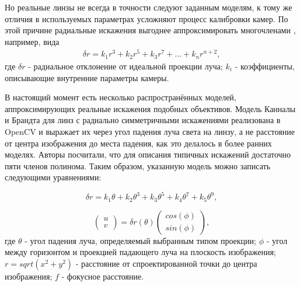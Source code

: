 Но реальные линзы не всегда в точности следуют заданным моделям, к тому же отличия в используемых параметрах усложняют процесс калибровки камер. 
По этой причине радиальные искажения выгоднее аппроксимировать многочленами \cite{opencv_model}, например, вида
 \begin{equation}	
	\begin{split}
        \delta r= k_1 r^3 + k_2 r^5 + k_3 r^7 + ... + k_n r^{n+2},
        \label{eqn:fisheye_distortion}
    \end{split}
\end{equation}
где $\delta r$ - радиальное отклонение от идеальной проекции луча;  $k_i$ - коэффициенты, описывающие внутренние параметры камеры. 

В настоящий момент есть несколько распространённых моделей, аппроксимирующих реальные искажения подобных объективов. Модель Канналы и 
Брандта \cite{opencv_model} для линз с радиально симметричными искажениями реализована в OpenCV и выражает их через угол падения луча света на линзу, а не расстояние  
от центра изображения до места падения, как это делалось в более ранних моделях. Авторы посчитали, что для описания типичных искажений достаточно 
пяти членов полинома. Таким образом, указанную модель можно записать следующими уравнениями:

\begin{equation}	
    \delta r = k_1\theta + k_2\theta^3 + k_3\theta^5 + k_4\theta^7 + k_5\theta^9,
    \label{eqn:kannala_r}
\end{equation}

\begin{equation}	
    \begin{pmatrix}u\\v\end{pmatrix} = \delta r(\theta)\begin{pmatrix}cos(\phi)\\sin(\phi)\end{pmatrix},
    \label{eqn:kannala_uv}
\end{equation}
где $\theta$ - угол падения луча, определяемый выбранным типом проекции; $\phi$ - угол между горизонтом 
и проекцией падающего луча на плоскость изображения; $r = sqrt(x^2+y^2)$ - расстояние от спроектированной точки до центра
изображения; $f$ - фокусное расстояние.

